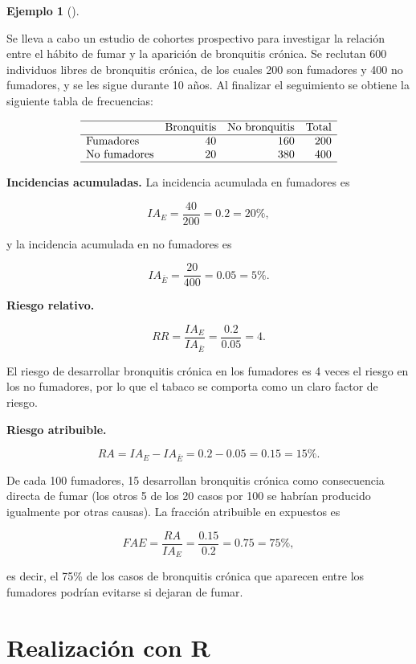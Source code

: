 \documentclass[
  spanish,
  a4paper,
]{scrreport}
\theoremstyle{definition}
\newtheorem{example}{Ejemplo}[chapter]
\theoremstyle{definition}
\theoremstyle{remark}
\begin{document}
\begin{example}[]\protect\hypertarget{exm-cohortes-riesgo-relativo-atribuible}{}\label{exm-cohortes-riesgo-relativo-atribuible}

Se lleva a cabo un estudio de cohortes prospectivo para investigar la
relación entre el hábito de fumar y la aparición de bronquitis crónica.
Se reclutan 600 individuos libres de bronquitis crónica, de los cuales
200 son fumadores y 400 no fumadores, y se les sigue durante 10 años. Al
finalizar el seguimiento se obtiene la siguiente tabla de frecuencias:

\[
\begin{array}{lrrr}
\hline
 & \mbox{Bronquitis} & \mbox{No bronquitis} & \mbox{Total}\\
\hline
\mbox{Fumadores} & 40 & 160 & 200\\
\mbox{No fumadores} & 20 & 380 & 400\\
\hline
\end{array}
\]

\textbf{Incidencias acumuladas.} La incidencia acumulada en fumadores es

\[IA_E = \frac{40}{200} = 0.2 = 20\%,\]

y la incidencia acumulada en no fumadores es

\[IA_{\bar E} = \frac{20}{400} = 0.05 = 5\%.\]

\textbf{Riesgo relativo.}

\[RR = \frac{IA_E}{IA_{\bar E}} = \frac{0.2}{0.05} = 4.\]

El riesgo de desarrollar bronquitis crónica en los fumadores es 4 veces
el riesgo en los no fumadores, por lo que el tabaco se comporta como un
claro factor de riesgo.

\textbf{Riesgo atribuible.}

\[RA = IA_E - IA_{\bar E} = 0.2 - 0.05 = 0.15 = 15\%.\]

De cada 100 fumadores, 15 desarrollan bronquitis crónica como
consecuencia directa de fumar (los otros 5 de los 20 casos por 100 se
habrían producido igualmente por otras causas). La fracción atribuible
en expuestos es

\[FAE = \frac{RA}{IA_E} = \frac{0.15}{0.2} = 0.75 = 75\%,\]

es decir, el 75\% de los casos de bronquitis crónica que aparecen entre
los fumadores podrían evitarse si dejaran de fumar.

\end{example}

\section{Realización con R}\label{realizaciuxf3n-con-r-2}
\end{document}
